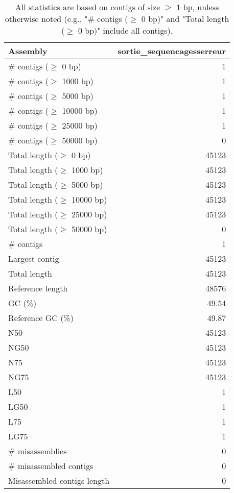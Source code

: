 \documentclass[12pt,a4paper]{article}
\begin{document}
\begin{table}[ht]
\begin{center}
\caption{All statistics are based on contigs of size $\geq$ 1 bp, unless otherwise noted (e.g., "\# contigs ($\geq$ 0 bp)" and "Total length ($\geq$ 0 bp)" include all contigs).}
\begin{tabular}{|l*{1}{|r}|}
\hline
Assembly & sortie\_sequencagesserreur \\ \hline
\# contigs ($\geq$ 0 bp) & 1 \\ \hline
\# contigs ($\geq$ 1000 bp) & 1 \\ \hline
\# contigs ($\geq$ 5000 bp) & 1 \\ \hline
\# contigs ($\geq$ 10000 bp) & 1 \\ \hline
\# contigs ($\geq$ 25000 bp) & 1 \\ \hline
\# contigs ($\geq$ 50000 bp) & 0 \\ \hline
Total length ($\geq$ 0 bp) & 45123 \\ \hline
Total length ($\geq$ 1000 bp) & 45123 \\ \hline
Total length ($\geq$ 5000 bp) & 45123 \\ \hline
Total length ($\geq$ 10000 bp) & 45123 \\ \hline
Total length ($\geq$ 25000 bp) & 45123 \\ \hline
Total length ($\geq$ 50000 bp) & 0 \\ \hline
\# contigs & 1 \\ \hline
Largest contig & 45123 \\ \hline
Total length & 45123 \\ \hline
Reference length & 48576 \\ \hline
GC (\%) & 49.54 \\ \hline
Reference GC (\%) & 49.87 \\ \hline
N50 & 45123 \\ \hline
NG50 & 45123 \\ \hline
N75 & 45123 \\ \hline
NG75 & 45123 \\ \hline
L50 & 1 \\ \hline
LG50 & 1 \\ \hline
L75 & 1 \\ \hline
LG75 & 1 \\ \hline
\# misassemblies & 0 \\ \hline
\# misassembled contigs & 0 \\ \hline
Misassembled contigs length & 0 \\ \hline

\end{tabular}
\end{center}
\end{table}
\end{document}
